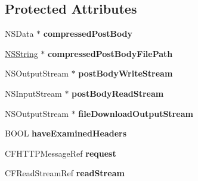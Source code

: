 \subsection*{Protected Attributes}
\begin{DoxyCompactItemize}
\item 
\hypertarget{interface_a_s_i_h_t_t_p_request_a1da882dbe37e07dfa6469dc3a900fd4b}{
NSData $\ast$ {\bfseries compressedPostBody}}
\label{interface_a_s_i_h_t_t_p_request_a1da882dbe37e07dfa6469dc3a900fd4b}

\item 
\hypertarget{interface_a_s_i_h_t_t_p_request_a8eb207eb1f5170ff4144bcd7f872948f}{
\hyperlink{class_n_s_string}{NSString} $\ast$ {\bfseries compressedPostBodyFilePath}}
\label{interface_a_s_i_h_t_t_p_request_a8eb207eb1f5170ff4144bcd7f872948f}

\item 
\hypertarget{interface_a_s_i_h_t_t_p_request_af1414dde76053106f008e998e4234c1b}{
NSOutputStream $\ast$ {\bfseries postBodyWriteStream}}
\label{interface_a_s_i_h_t_t_p_request_af1414dde76053106f008e998e4234c1b}

\item 
\hypertarget{interface_a_s_i_h_t_t_p_request_acdad29e2814eab8c071f700216ff6c6d}{
NSInputStream $\ast$ {\bfseries postBodyReadStream}}
\label{interface_a_s_i_h_t_t_p_request_acdad29e2814eab8c071f700216ff6c6d}

\item 
\hypertarget{interface_a_s_i_h_t_t_p_request_ac3adbb7024bfb74288106a331dc594c9}{
NSOutputStream $\ast$ {\bfseries fileDownloadOutputStream}}
\label{interface_a_s_i_h_t_t_p_request_ac3adbb7024bfb74288106a331dc594c9}

\item 
\hypertarget{interface_a_s_i_h_t_t_p_request_aede435a85f87109a18819b3d69976fec}{
BOOL {\bfseries haveExaminedHeaders}}
\label{interface_a_s_i_h_t_t_p_request_aede435a85f87109a18819b3d69976fec}

\item 
\hypertarget{interface_a_s_i_h_t_t_p_request_a43c23393b18061ee1ab4c5714c23867d}{
CFHTTPMessageRef {\bfseries request}}
\label{interface_a_s_i_h_t_t_p_request_a43c23393b18061ee1ab4c5714c23867d}

\item 
\hypertarget{interface_a_s_i_h_t_t_p_request_a01140875da93a859a90b5adfd011c126}{
CFReadStreamRef {\bfseries readStream}}
\label{interface_a_s_i_h_t_t_p_request_a01140875da93a859a90b5adfd011c126}


\end{DoxyCompactItemize}
